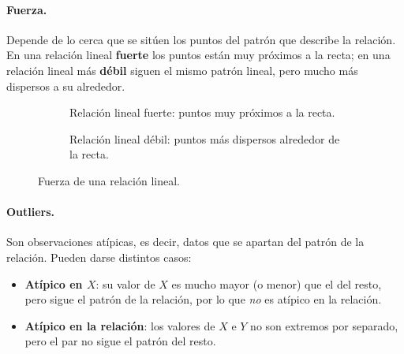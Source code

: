 \paragraph{Fuerza.} Depende de lo cerca que se sitúen los puntos del patrón que describe la
relación. En una relación lineal \textbf{fuerte} los puntos están muy próximos a la recta; en
una relación lineal más \textbf{débil} siguen el mismo patrón lineal, pero mucho más dispersos a
su alrededor.

\begin{figure}[H]
  \centering
  \begin{subfigure}[t]{0.45\linewidth}
    \centering
    \caption{Relación lineal fuerte: puntos muy próximos a la recta.}
  \end{subfigure}\hfill
  \begin{subfigure}[t]{0.45\linewidth}
    \centering
    \caption{Relación lineal débil: puntos más dispersos alrededor de la recta.}
  \end{subfigure}
  \caption{Fuerza de una relación lineal.}
\end{figure}

\paragraph{Outliers.} Son observaciones atípicas, es decir, datos que se apartan del patrón de
la relación. Pueden darse distintos casos:
\begin{itemize}
  \item \textbf{Atípico en $X$}: su valor de $X$ es mucho mayor (o menor) que el del resto,
    pero sigue el patrón de la relación, por lo que \emph{no} es atípico en la relación.
  \item \textbf{Atípico en la relación}: los valores de $X$ e $Y$ no son extremos por separado,
    pero el par no sigue el patrón del resto.
\end{itemize}


